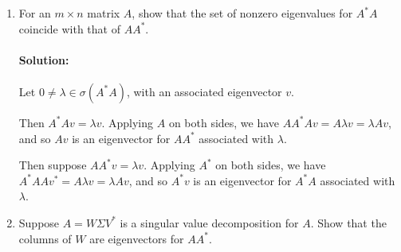 \documentclass{article}
\begin{document}
\begin{enumerate}

\item For an $m \times  n$ matrix $A$, show that the set of nonzero eigenvalues for $A^*  A$ coincide with that of $AA^* $.
    \paragraph{Solution: }Let $0\neq \lambda\in \sigma(A^* A)$, with an associated eigenvector $v$.

    Then $A^* Av=\lambda v$. Applying $A$ on both sides, we have $A A^*  Av=A\lambda v=\lambda Av$, and so $Av$ is an eigenvector for $A A^* $ associated with $\lambda$.

    Then suppose $A A^*v=\lambda v$. Applying $A^* $ on both sides, we have $A ^*A  Av^*=A\lambda v=\lambda Av$, and so $A^*v$ is an eigenvector for $A ^*A$ associated with $\lambda$.

\item Suppose $A = W \Sigma V^* $ is a singular value decomposition for $A$. Show that the columns of $W$ are eigenvectors for $AA^* $.

\end{enumerate}
\end{document}
